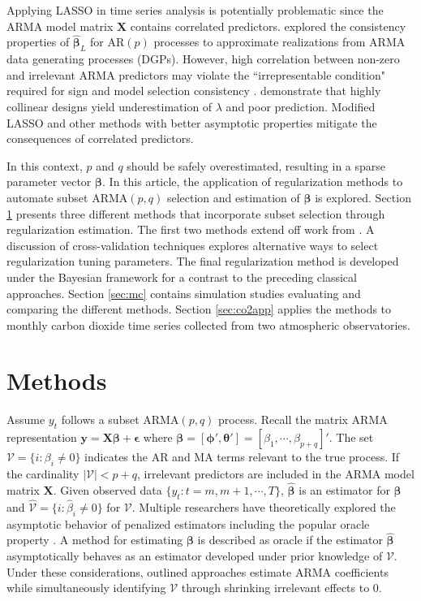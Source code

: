 Applying LASSO in time series analysis is potentially problematic since the ARMA model matrix $\bm{X}$ contains correlated predictors.  \cite{Nardi2011} explored the consistency properties of $\hat{\bm{\beta}}_{L}$ for AR$(p)$ processes to approximate realizations from ARMA data generating processes (DGPs). However, high correlation between non-zero and irrelevant ARMA predictors may violate the ``irrepresentable condition" required for sign and model selection consistency \citep{Zhao2006}. \cite{Hebiri2013} demonstrate that highly collinear designs yield underestimation of $\lambda$ and poor prediction. Modified LASSO and other methods with better asymptotic properties mitigate the consequences of correlated predictors.

In this context, $p$ and $q$ should be safely overestimated, resulting in a sparse parameter vector $\bm{\beta}$. In this article, the application of regularization methods to automate subset ARMA$(p,q)$ selection and estimation of $\bm{\beta}$ is explored. Section \ref{sec:methods} presents three different methods that incorporate subset selection through regularization estimation. The first two methods extend off work from \cite{Chen2011}. A discussion of cross-validation techniques explores alternative ways to select regularization tuning parameters. The final regularization method is developed under the Bayesian framework for a contrast to the preceding classical approaches. Section \ref{sec:mc} contains simulation studies evaluating and comparing the different methods. Section \ref{sec:co2app} applies the methods to monthly carbon dioxide time series collected from two atmospheric observatories.










\section{Methods}
\label{sec:methods}

Assume $y_t$ follows a subset ARMA$(p,q)$ process. Recall the matrix ARMA representation $\bm{y}=\bm{X}\bm{\beta}+\bm{\epsilon}$ where $\bm{\beta}=[\bm{\phi}',\bm{\theta}']=[\beta_1,\cdots,\beta_{p+q}]'$. The set $\mathcal{V}=\{i:\beta_i\neq 0\}$ indicates the AR and MA terms relevant to the true process. If the cardinality $|\mathcal{V}|<p+q$, irrelevant predictors are included in the ARMA model matrix $\bm{X}$. Given observed data $\{y_t: t=m,m+1,\cdots,T\}$, $\hat{\bm{\beta}}$ is an estimator for $\bm{\beta}$ and $\hat{\mathcal{V}}=\{i:\hat{\beta}_i\neq 0\}$ for $\mathcal{V}$. Multiple researchers have theoretically explored the asymptotic behavior of penalized estimators including the popular oracle property \citep{Fan2001,Fan2004,Fan2011}. A method for estimating $\bm{\beta}$ is described as oracle if the estimator $\hat{\bm{\beta}}$ asymptotically behaves as an estimator developed under prior knowledge of $\mathcal{V}$. Under these considerations, outlined approaches estimate ARMA coefficients while simultaneously identifying $\mathcal{V}$ through shrinking irrelevant effects to 0.

